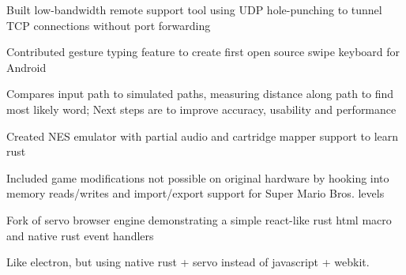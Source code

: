 \documentclass[12pt]{jmichaud-resume}
\begin{document}
\begin{minipage}[t]{0.64\textwidth}
 \hfill {}

\vspace{3pt}

\begin{tightemize}
	\item Built low-bandwidth remote support tool using UDP hole-punching to tunnel TCP connections without port forwarding
\end{tightemize}
\sectionsep

 \hfill {}

\sectionsep

 \hfill
{}
\begin{tightemize}
	\item Contributed gesture typing feature to create first open source swipe keyboard for Android
	\item Compares input path to simulated paths, measuring distance along path to find most likely word; Next steps are to improve accuracy, usability and performance
\end{tightemize}

\sectionsep

 \hfill
{}
\begin{tightemize}
	\item Created NES emulator with partial audio and cartridge mapper support to learn rust
	\item Included game modifications not possible on original hardware by hooking into memory reads/writes and import/export support for Super Mario Bros. levels
\end{tightemize}

\sectionsep
\iffalse
\runsubsection{GlideN64} \hfill
\location{C++, OpenGL}
\begin{tightemize}
	\item Created patch adding stereo rendering and google cardboard support to GlideN64 Nintendo 64 graphics plugin (too unstable to merge)
	\item Applies eye translation after projection matrix is applied but before perspective divide, avoiding toe-in artifacts
\end{tightemize}
\sectionsep
\fi

\iftrue
{} \hfill
{}
\begin{tightemize}
	\item Fork of servo browser engine demonstrating a simple react-like rust html macro and native rust event handlers
	\item Like electron, but using native rust + servo instead of javascript + webkit. 
\end{tightemize}
\sectionsep
\fi

\end{minipage}
\end{document}
